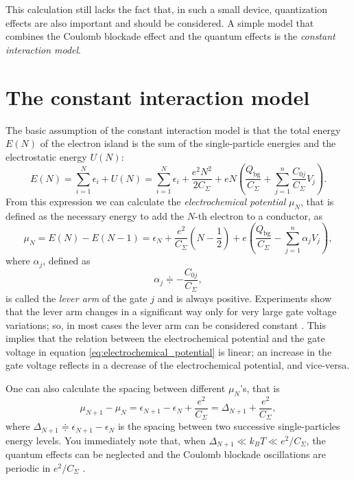 This calculation still lacks the fact that, in such a small device, quantization effects are also important and should be considered. A simple model that combines the Coulomb blockade effect and the quantum effects is the \emph{constant interaction model}.

\section{The constant interaction model}
The basic assumption of the constant interaction model is that the total energy $E(N)$ of the electron island is the sum of the single-particle energies and the electrostatic energy $U(N)$:
\begin{equation}
	E(N) = \sum_{i=1}^{N}\epsilon_i + U(N) = \sum_{i=1}^{N}\epsilon_i + \frac{e^2N^2}{2C_{\Sigma}} + eN\left( \frac{Q_{\text{bg}}}{C_{\Sigma}} + \sum_{j=1}^{n}\frac{C_{0j}}{C_{\Sigma}}V_j \right).
\end{equation}
From this expression we can calculate the \emph{electrochemical potential} $\mu_N$, that is defined as the necessary energy to add the $N$-th electron to a conductor, as
\begin{equation}
	\mu_N 
	= E(N) - E(N-1) 
	=  \epsilon_N + \frac{e^2}{C_{\Sigma}}\left(N-\frac{1}{2}\right) + e\left( \frac{Q_{\text{bg}}}{C_{\Sigma}} - \sum_{j=1}^{n}\alpha_jV_j \right),
	\label{eq:electrochemical_potential}
\end{equation}
where $\alpha_j$, defined as
\begin{equation}
	\alpha_j \doteqdot - \frac{C_{0j}}{C_{\Sigma}},
\end{equation}
is called the \emph{lever arm} of the gate $j$ and is always positive. Experiments show that the lever arm changes in a significant way only for very large gate voltage variations; so, in most cases the lever arm can be considered constant \citep{Fasth2007}. This implies that the relation between the electrochemical potential and the gate voltage in equation \eqref{eq:electrochemical_potential} is linear; an increase in the gate voltage reflects in a decrease of the electrochemical potential, and vice-versa.

One can also calculate the spacing between different $\mu_N$'s, that is
\begin{equation}
	\mu_{N+1}-\mu_N 
	= \epsilon_{N+1} - \epsilon_{N} + \frac{e^2}{C_{\Sigma}}
	= \Delta_{N+1} + \frac{e^2}{C_{\Sigma}},
\end{equation}
where $\Delta_{N+1}\doteqdot \epsilon_{N+1} - \epsilon_{N}$ is the spacing between two successive single-particles energy levels. You immediately note that, when $\Delta_{N+1} \ll k_BT \ll e^2/C_{\Sigma}$, the quantum effects can be neglected and the Coulomb blockade oscillations are periodic in $e^2/C_{\Sigma}$ \citep{Reimann2002}.

